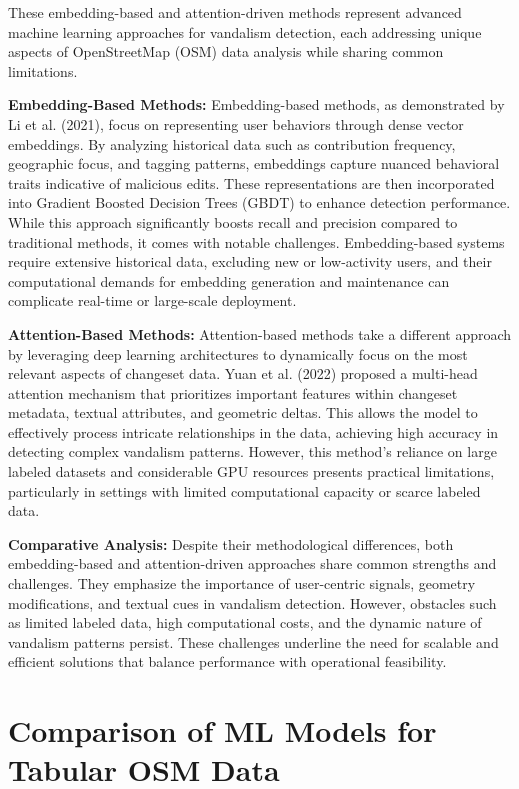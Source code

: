 \documentclass[
    13pt, %
    a4paper, %
    DIV14, %
    listof=totoc, %
    bibliography=totoc, %
    index=totoc, %
    headsepline
]{scrreprt}
\begin{document}
These embedding-based and attention-driven methods represent advanced machine learning approaches for vandalism detection, each addressing unique aspects of OpenStreetMap (OSM) data analysis while sharing common limitations.

\textbf{Embedding-Based Methods:}
Embedding-based methods, as demonstrated by Li et al. (2021), focus on representing user behaviors through dense vector embeddings. By analyzing historical data such as contribution frequency, geographic focus, and tagging patterns, embeddings capture nuanced behavioral traits indicative of malicious edits. These representations are then incorporated into Gradient Boosted Decision Trees (GBDT) to enhance detection performance. While this approach significantly boosts recall and precision compared to traditional methods, it comes with notable challenges. Embedding-based systems require extensive historical data, excluding new or low-activity users, and their computational demands for embedding generation and maintenance can complicate real-time or large-scale deployment.

\textbf{Attention-Based Methods:}
Attention-based methods take a different approach by leveraging deep learning architectures to dynamically focus on the most relevant aspects of changeset data. Yuan et al. (2022) proposed a multi-head attention mechanism that prioritizes important features within changeset metadata, textual attributes, and geometric deltas. This allows the model to effectively process intricate relationships in the data, achieving high accuracy in detecting complex vandalism patterns. However, this method’s reliance on large labeled datasets and considerable GPU resources presents practical limitations, particularly in settings with limited computational capacity or scarce labeled data.

\textbf{Comparative Analysis:}
Despite their methodological differences, both embedding-based and attention-driven approaches share common strengths and challenges. They emphasize the importance of user-centric signals, geometry modifications, and textual cues in vandalism detection. However, obstacles such as limited labeled data, high computational costs, and the dynamic nature of vandalism patterns persist. These challenges underline the need for scalable and efficient solutions that balance performance with operational feasibility.

\section{Comparison of ML Models for Tabular OSM Data}
\label{sec:ml_comparison_for_osm}
\end{document}
